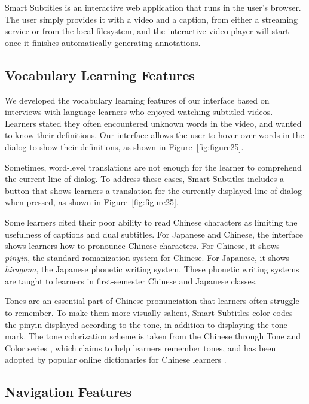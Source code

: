 \documentclass{sigchi}
\begin{document}
Smart Subtitles is an interactive web application that runs in the user's browser. The user simply provides it with a video and a caption, from either a streaming service or from the local filesystem,
and the interactive video player will start once it finishes automatically
generating annotations.

\subsection{Vocabulary Learning Features}

We developed the vocabulary learning features of our interface based
on interviews with language learners who enjoyed watching subtitled videos. Learners stated they often encountered
unknown words in the video, and wanted to know their definitions.
Our interface allows the user to hover over words in
the dialog to show their definitions, as shown in Figure~\ref{fig:figure25}.

Sometimes, word-level translations are not enough for the learner to comprehend the current line of dialog. To address these cases, Smart Subtitles includes a button that shows learners a translation for the currently displayed line of dialog when pressed, as shown in Figure~\ref{fig:figure25}.

Some learners cited their poor ability to
read Chinese characters
as limiting the usefulness of captions and dual subtitles.
For Japanese and Chinese, the interface shows learners how to pronounce
Chinese characters. For Chinese, it shows \emph{pinyin}, the standard romanization system for Chinese. For Japanese, it shows \emph{hiragana}, the Japanese phonetic writing system. These phonetic writing systems are taught to learners in first-semester Chinese and Japanese classes.

Tones are an essential part of Chinese pronunciation that learners often struggle to remember. To make them more visually salient, Smart Subtitles color-codes the pinyin displayed according to the tone, in addition to displaying the tone mark. The tone colorization scheme is taken from the Chinese through Tone and Color series \cite{tonecolor}, which claims to help learners remember tones, and has been adopted by popular online dictionaries for Chinese learners \cite{mdbg}.

\subsection{Navigation Features}
\end{document}
